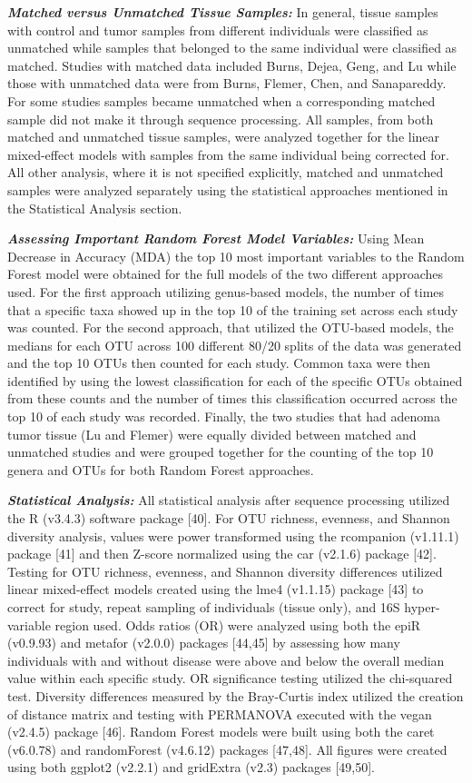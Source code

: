 \documentclass[12pt,]{article}
\begin{document}
\textbf{\emph{Matched versus Unmatched Tissue Samples:}} In general,
tissue samples with control and tumor samples from different individuals
were classified as unmatched while samples that belonged to the same
individual were classified as matched. Studies with matched data
included Burns, Dejea, Geng, and Lu while those with unmatched data were
from Burns, Flemer, Chen, and Sanapareddy. For some studies samples
became unmatched when a corresponding matched sample did not make it
through sequence processing. All samples, from both matched and
unmatched tissue samples, were analyzed together for the linear
mixed-effect models with samples from the same individual being
corrected for. All other analysis, where it is not specified explicitly,
matched and unmatched samples were analyzed separately using the
statistical approaches mentioned in the Statistical Analysis section.

\textbf{\emph{Assessing Important Random Forest Model Variables:}} Using
Mean Decrease in Accuracy (MDA) the top 10 most important variables to
the Random Forest model were obtained for the full models of the two
different approaches used. For the first approach utilizing genus-based
models, the number of times that a specific taxa showed up in the top 10
of the training set across each study was counted. For the second
approach, that utilized the OTU-based models, the medians for each OTU
across 100 different 80/20 splits of the data was generated and the top
10 OTUs then counted for each study. Common taxa were then identified by
using the lowest classification for each of the specific OTUs obtained
from these counts and the number of times this classification occurred
across the top 10 of each study was recorded. Finally, the two studies
that had adenoma tumor tissue (Lu and Flemer) were equally divided
between matched and unmatched studies and were grouped together for the
counting of the top 10 genera and OTUs for both Random Forest
approaches.

\textbf{\emph{Statistical Analysis:}} All statistical analysis after
sequence processing utilized the R (v3.4.3) software package {[}40{]}.
For OTU richness, evenness, and Shannon diversity analysis, values were
power transformed using the rcompanion (v1.11.1) package {[}41{]} and
then Z-score normalized using the car (v2.1.6) package {[}42{]}. Testing
for OTU richness, evenness, and Shannon diversity differences utilized
linear mixed-effect models created using the lme4 (v1.1.15) package
{[}43{]} to correct for study, repeat sampling of individuals (tissue
only), and 16S hyper-variable region used. Odds ratios (OR) were
analyzed using both the epiR (v0.9.93) and metafor (v2.0.0) packages
{[}44,45{]} by assessing how many individuals with and without disease
were above and below the overall median value within each specific
study. OR significance testing utilized the chi-squared test. Diversity
differences measured by the Bray-Curtis index utilized the creation of
distance matrix and testing with PERMANOVA executed with the vegan
(v2.4.5) package {[}46{]}. Random Forest models were built using both
the caret (v6.0.78) and randomForest (v4.6.12) packages {[}47,48{]}. All
figures were created using both ggplot2 (v2.2.1) and gridExtra (v2.3)
packages {[}49,50{]}.
\end{document}
